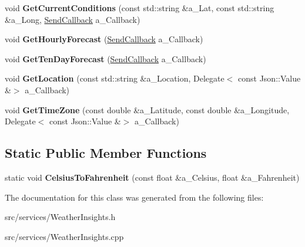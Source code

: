 \begin{DoxyCompactItemize}
\mbox{\label{class_weather_insights_a25bad60d47a1e0fab54256022a778bb4}} 
void {\bfseries Get\+Current\+Conditions} (const std\+::string \&a\+\_\+\+Lat, const std\+::string \&a\+\_\+\+Long, \hyperlink{class_weather_insights_a65ee20ca4986e83a6de60b1f2a4e36ac}{Send\+Callback} a\+\_\+\+Callback)
\item 
\mbox{\label{class_weather_insights_a3a8591802cc5eb9e228a11fd9a42c4a9}} 
void {\bfseries Get\+Hourly\+Forecast} (\hyperlink{class_weather_insights_a65ee20ca4986e83a6de60b1f2a4e36ac}{Send\+Callback} a\+\_\+\+Callback)
\item 
\mbox{\label{class_weather_insights_a536e90d9b7b3ee4474e54f5f8a8bb07c}} 
void {\bfseries Get\+Ten\+Day\+Forecast} (\hyperlink{class_weather_insights_a65ee20ca4986e83a6de60b1f2a4e36ac}{Send\+Callback} a\+\_\+\+Callback)
\item 
\mbox{\label{class_weather_insights_a937d693a2274d385748fa7b2b6692951}} 
void {\bfseries Get\+Location} (const std\+::string \&a\+\_\+\+Location, Delegate$<$ const Json\+::\+Value \&$>$ a\+\_\+\+Callback)
\item 
\mbox{\label{class_weather_insights_a37e7892a877eb8fa9113dbdb0434cb31}} 
void {\bfseries Get\+Time\+Zone} (const double \&a\+\_\+\+Latitude, const double \&a\+\_\+\+Longitude, Delegate$<$ const Json\+::\+Value \&$>$ a\+\_\+\+Callback)
\end{DoxyCompactItemize}
\subsection*{Static Public Member Functions}
\begin{DoxyCompactItemize}
\item 
\mbox{\label{class_weather_insights_a6d6e026da75d5a829d6e18e2be337506}} 
static void {\bfseries Celsius\+To\+Fahrenheit} (const float \&a\+\_\+\+Celsius, float \&a\+\_\+\+Fahrenheit)
\end{DoxyCompactItemize}


The documentation for this class was generated from the following files\+:\begin{DoxyCompactItemize}
\item 
src/services/Weather\+Insights.\+h\item 
src/services/Weather\+Insights.\+cpp\end{DoxyCompactItemize}
